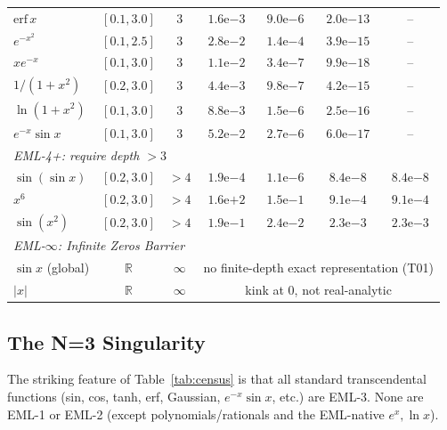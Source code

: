 \begin{table}[h]
\begin{tabular}{lcccccc}
$\mathrm{erf}\,x$ & $[0.1, 3.0]$ & 3 & $1.6\mathrm{e}{-3}$ & $9.0\mathrm{e}{-6}$ & $2.0\mathrm{e}{-13}$ & -- \\
$e^{-x^2}$        & $[0.1, 2.5]$ & 3 & $2.8\mathrm{e}{-2}$ & $1.4\mathrm{e}{-4}$ & $3.9\mathrm{e}{-15}$ & -- \\
$x e^{-x}$        & $[0.1, 3.0]$ & 3 & $1.1\mathrm{e}{-2}$ & $3.4\mathrm{e}{-7}$ & $9.9\mathrm{e}{-18}$ & -- \\
$1/(1+x^2)$       & $[0.2, 3.0]$ & 3 & $4.4\mathrm{e}{-3}$ & $9.8\mathrm{e}{-7}$ & $4.2\mathrm{e}{-15}$ & -- \\
$\ln(1+x^2)$      & $[0.1, 3.0]$ & 3 & $8.8\mathrm{e}{-3}$ & $1.5\mathrm{e}{-6}$ & $2.5\mathrm{e}{-16}$ & -- \\
$e^{-x}\sin x$    & $[0.1, 3.0]$ & 3 & $5.2\mathrm{e}{-2}$ & $2.7\mathrm{e}{-6}$ & $6.0\mathrm{e}{-17}$ & -- \\
\hline
\multicolumn{7}{l}{\emph{EML-4+: require depth $>3$}} \\
$\sin(\sin x)$    & $[0.2, 3.0]$ & $>4$ & $1.9\mathrm{e}{-4}$ & $1.1\mathrm{e}{-6}$ & $8.4\mathrm{e}{-8}$ & $8.4\mathrm{e}{-8}$ \\
$x^6$             & $[0.2, 3.0]$ & $>4$ & $1.6\mathrm{e}{+2}$ & $1.5\mathrm{e}{-1}$ & $9.1\mathrm{e}{-4}$ & $9.1\mathrm{e}{-4}$ \\
$\sin(x^2)$       & $[0.2, 3.0]$ & $>4$ & $1.9\mathrm{e}{-1}$ & $2.4\mathrm{e}{-2}$ & $2.3\mathrm{e}{-3}$ & $2.3\mathrm{e}{-3}$ \\
\hline
\multicolumn{7}{l}{\emph{EML-$\infty$: Infinite Zeros Barrier}} \\
$\sin x$ (global) & $\mathbb{R}$ & $\infty$ & \multicolumn{4}{c}{no finite-depth exact representation (T01)} \\
$|x|$             & $\mathbb{R}$ & $\infty$ & \multicolumn{4}{c}{kink at 0, not real-analytic} \\
\hline
\end{tabular}
\end{table}

\subsection{The N=3 Singularity}

The striking feature of Table~\ref{tab:census} is that all standard
transcendental functions (sin, cos, tanh, erf, Gaussian, $e^{-x}\sin x$,
etc.) are EML-3. None are EML-1 or EML-2 (except polynomials/rationals
and the EML-native $e^x, \ln x$).


